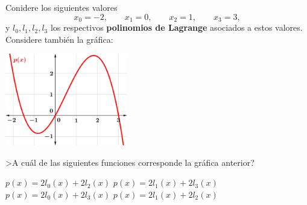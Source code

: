 \begin{pregunta}
\begin{cuerpo}
Conidere los siguientes valores
$$
x_0=-2,\qquad x_1=0,\qquad x_2=1,\qquad x_3=3,
$$
y $l_0, l_1, l_2, l_3$ los respectivos \textbf{polinomios de Lagrange} asociados a estos valores. Considere tambi\'en la gr\'afica:
\medskip

\centerline{\includegraphics[width=0.4\textwidth]{./img/lagrange.png}}
\medskip

>A cu\'al de las siguientes funciones corresponde la gr\'afica anterior?
\end{cuerpo}
\begin{multicols}{2}
\begin{alternativas}
{$p(x)=2l_0(x)+2l_2(x)$}
{$p(x)=2l_1(x)+2l_3(x)$}
{$p(x)=2l_0(x)+2l_3(x)$}
{$p(x)=2l_1(x)+2l_2(x)$}
\end{alternativas}
\end{multicols}
\justificacion{0cm}
\end{pregunta}